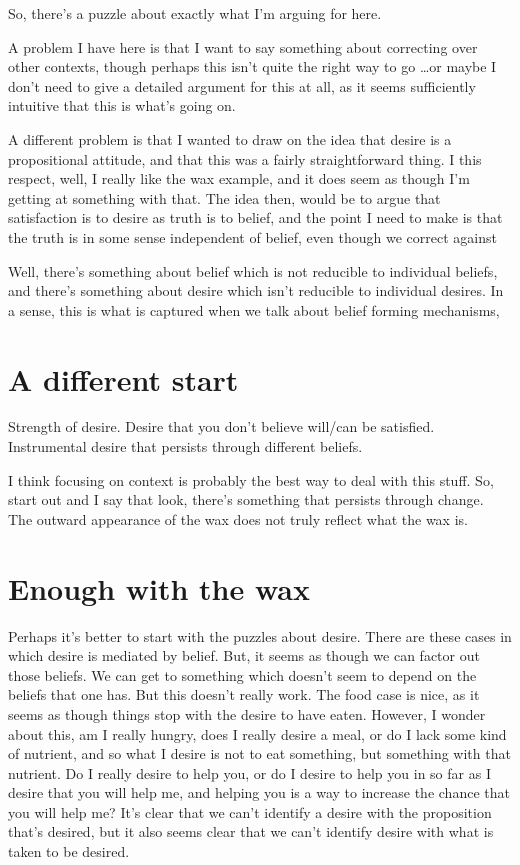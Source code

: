 \documentclass[10pt]{article}
\begin{document}
So, there's a puzzle about exactly what I'm arguing for here.




A problem I have here is that I want to say something about correcting over other contexts, though perhaps this isn't quite the right way to go \dots or maybe I don't need to give a detailed argument for this at all, as it seems sufficiently intuitive that this is what's going on.

A different problem is that I wanted to draw on the idea that desire is a propositional attitude, and that this was a fairly straightforward thing.
I this respect, well, I really like the wax example, and it does seem as though I'm getting at something with that.
The idea then, would be to argue that satisfaction is to desire as truth is to belief, and the point I need to make is that the truth is in some sense independent of belief, even though we correct against

Well, there's something about belief which is not reducible to individual beliefs, and there's something about desire which isn't reducible to individual desires.
In a sense, this is what is captured when we talk about belief forming mechanisms, 

\section{A different start}
\label{sec:different-start}

Strength of desire.
Desire that you don't believe will/can be satisfied.
Instrumental desire that persists through different beliefs.

I think focusing on context is probably the best way to deal with this stuff.
So, start out and I say that look, there's something that persists through change.
The outward appearance of the wax does not truly reflect what the wax is.


\section{Enough with the wax}
\label{sec:enough-with-wax}





Perhaps it's better to start with the puzzles about desire.
There are these cases in which desire is mediated by belief.
But, it seems as though we can factor out those beliefs.
We can get to something which doesn't seem to depend on the beliefs that one has.
But this doesn't really work.
The food case is nice, as it seems as though things stop with the desire to have eaten.
However, I wonder about this, am I really hungry, does I really desire a meal, or do I lack some kind of nutrient, and so what I desire is not to eat something, but something with that nutrient.
Do I really desire to help you, or do I desire to help you in so far as I desire that you will help me, and helping you is a way to increase the chance that you will help me?
It's clear that we can't identify a desire with the proposition that's desired, but it also seems clear that we can't identify desire with what is taken to be desired.
\end{document}
